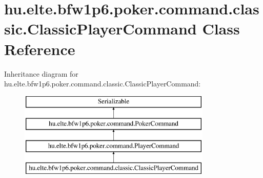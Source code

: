 \hypertarget{classhu_1_1elte_1_1bfw1p6_1_1poker_1_1command_1_1classic_1_1_classic_player_command}{}\section{hu.\+elte.\+bfw1p6.\+poker.\+command.\+classic.\+Classic\+Player\+Command Class Reference}
\label{classhu_1_1elte_1_1bfw1p6_1_1poker_1_1command_1_1classic_1_1_classic_player_command}
Inheritance diagram for hu.\+elte.\+bfw1p6.\+poker.\+command.\+classic.\+Classic\+Player\+Command\+:\begin{figure}[H]
\begin{center}
\leavevmode
\includegraphics[height=4.000000cm]{classhu_1_1elte_1_1bfw1p6_1_1poker_1_1command_1_1classic_1_1_classic_player_command}
\end{center}
\end{figure}
